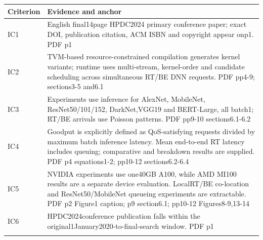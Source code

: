 \begin{longtable}{>{\raggedright\arraybackslash}p{}>{\raggedright\arraybackslash}p{}}
\toprule
\textbf{Criterion} & \textbf{Evidence and anchor}\\\midrule\endhead
IC1 & English final14page HPDC2024 primary conference paper;\allowbreak{} exact DOI,\allowbreak{} publication citation,\allowbreak{} ACM ISBN and copyright appear onp1. PDF p1\\\addlinespace
IC2 & TVM-based resource-constrained compilation generates kernel variants;\allowbreak{} runtime uses multi-stream,\allowbreak{} kernel-order and candidate scheduling across simultaneous RT/BE DNN requests. PDF pp4-9;\allowbreak{} sections3-5 and6.1\\\addlinespace
IC3 & Experiments use inference for AlexNet,\allowbreak{} MobileNet,\allowbreak{} ResNet50/101/152,\allowbreak{} DarkNet,\allowbreak{}VGG19 and BERT-Large,\allowbreak{} all batch1;\allowbreak{} RT/BE arrivals use Poisson patterns. PDF pp9-10 sections6.1-6.2\\\addlinespace
IC4 & Goodput is explicitly defined as QoS-satisfying requests divided by maximum batch inference latency. Mean end-to-end RT latency includes queuing;\allowbreak{} comparative and breakdown results are supplied. PDF p4 equations1-2;\allowbreak{} pp10-12 sections6.2-6.4\\\addlinespace
IC5 & NVIDIA experiments use one40GB A100,\allowbreak{} while AMD MI100 results are a separate device evaluation. LocalRT/BE co-location and ResNet50/MobileNet queueing experiments are extractable. PDF p2 Figure1 caption;\allowbreak{} p9 section6.1;\allowbreak{} pp10-12 Figures8-9,\allowbreak{}13-14\\\addlinespace
IC6 & HPDC2024conference publication falls within the original1January2020-to-final-search window. PDF p1\\\addlinespace
\bottomrule\end{longtable}
